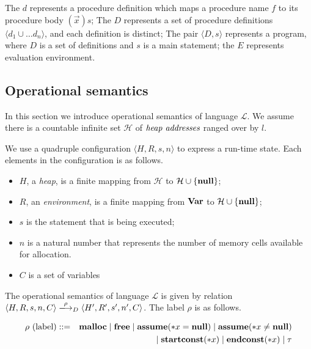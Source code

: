 The \(d\) represents a procedure definition which maps a procedure
name \(f\) to its procedure body \((\vec{x})s\); The \(D\) represents
a set of procedure definitions \(\langle d_1 \cup\dots d_n \rangle\),
and each definition is distinct; The pair \(\langle D, s \rangle \)
represents a program, where \(D\) is a set of definitions and \(s\) is
a main statement; the \(E\) represents evaluation environment.

\subsection{Operational semantics}
\label{sec:languageSemantics}
In this section we introduce operational semantics of language
\(\mathcal{L}\). We assume there is a countable infinite set
\(\mathcal{H}\) of \(\emph{heap addresses}\) ranged over by \(l\).

We use a quadruple configuration \(\langle H, R, s, n \rangle\) to
express a run-time state. Each elements in the configuration is as
follows.

\begin{itemize}
\item \(H\), a \emph{heap}, is a finite mapping from \(\mathcal{H}\)
  to \(\mathcal{H} \cup \{\mathbf{null}\}\);
\item \(R\), an \emph{environment}, is a finite mapping from \(\mathbf{Var}\)
  to \(\mathcal{H} \cup \{\mathbf{null}\}\);
\item \(s\) is the statement that is being executed; 
\item \(n\) is a natural number that represents the number of memory
  cells available for allocation.
\item \(C\) is a set of variables
\end{itemize}

The operational semantics of language \(\mathcal{L}\) is given by
relation \(\langle H, R, s, n, C \rangle \xlongrightarrow{\rho}_D
\langle H', R', s', n', C \rangle\). The label \(\rho\) is as follows.

\begin{eqnarray*}
 \rho \mbox{ (label)} &::=& \mathbf{malloc} \mid \mathbf{free} \mid \mathbf{assume}(*x = \mathbf{null}) \mid \mathbf{assume}(*x \ne \mathbf{null})  \\
 &&\mid \mathbf{startconst}(*x) \mid \mathbf{endconst}(*x) \mid \tau  \\
\end{eqnarray*}

